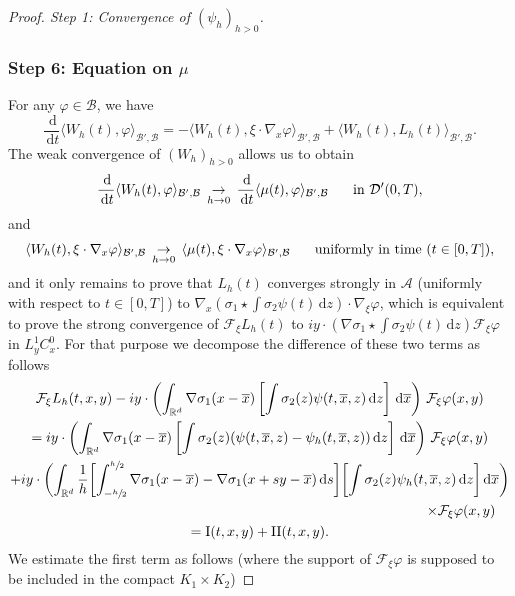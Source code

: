 \documentclass[JEP,XML,SOM,NoEqCountersInSection,NoFloatCountersInSection,Unicode,published]{cedram}
\let\bar\oldbar
\theoremstyle{definition}
\let\bar\overline
\newcommand{\R}{\mathbb{R}}
\newcommand{\ud}{\, {\mathrm{d}}}
\begin{document}
\begin{proof}[Proof. Step 1: Convergence of $(\psi_{h})_{h>0}$]
\subsubsection*{Step 6: Equation on $\mu$} For any $\varphi\in\mathcal{B}$, we have
\[
\frac{\ud}{\ud t}\langle W_{h}(t),\varphi\rangle_{\mathcal{B}',\mathcal{B}}=-\langle W_{h}(t),\xi\cdot\nabla_{x}\varphi\rangle_{\mathcal{B}',\mathcal{B}}+\langle W_{h}(t),L_{h}(t)\rangle_{\mathcal{B}',\mathcal{B}}.
\]
The weak convergence of $(W_{h})_{h>0}$ allows us to obtain
\[
\frac{\ud}{\ud t}\langle W_{h}(t),\varphi\rangle_{\mathcal{B}',\mathcal{B}}\,\underset{h\to 0}{\to}\,\frac{\ud}{\ud t}\langle \mu(t),\varphi\rangle_{\mathcal{B}',\mathcal{B}} \hspace{0.5cm}\text{ in }\mathcal{D}'(0,T),
\]
and
\[
\langle W_{h}(t),\xi\cdot\nabla_{x}\varphi\rangle_{\mathcal{B}',\mathcal{B}}\,\underset{h\to 0}{\to}\,\langle \mu(t),\xi\cdot\nabla_{x}\varphi\rangle_{\mathcal{B}',\mathcal{B}} \hspace{0.5cm}\text{ uniformly in time }(t\in[0,T]),
\]
and it only remains to prove that $L_{h}(t)$ converges strongly in $\mathcal{A}$ (uniformly with respect to $t\in[0,T]$) to $\nabla_{x}\left(\sigma_{1}\star\int\sigma_{2}\psi(t)\ud z\right)\cdot\nabla_{\xi}\varphi$, which is equivalent to prove the strong convergence of $\mathcal{F}_{\xi}L_{h}(t)$ to $iy\cdot(\nabla\sigma_{1}\star\int\sigma_{2}\psi(t)\ud z)\mathcal{F}_{\xi}\varphi$ in $L_{y}^{1}C_{x}^{0}$. For that purpose we decompose the difference of these two terms as follows
\bgroup
{}
\begin{multline*}
\mathcal{F}_{\xi}L_{h}(t,x,y)-iy\cdot\left(\int_{\R^{d}}\nabla\sigma_{1}(x-\bar{x})\left[\int\sigma_{2}(z)\psi(t,\bar{x},z)\ud z\right]\ud\bar{x}\right)\,\mathcal{F}_{\xi}\varphi(x,y)\\
=iy\cdot\left(\int_{\R^{d}}\nabla\sigma_{1}(x-\bar{x})\left[\int\sigma_{2}(z)(\psi(t,\bar{x},z)-\psi_{h}(t,\bar{x},z))\ud z\right]\ud\bar{x}\right)\,\mathcal{F}_{\xi}\varphi(x,y)\\
+iy\cdot\biggl(\int_{\R^{d}}\frac{1}{h}\biggl[\int_{-\sfrac{h}{2}}^{\sfrac{h}{2}}\nabla\sigma_{1}(x-\bar{x})-\nabla\sigma_{1}(x+sy-\bar{x})\ud s\biggr]\biggl[\int\sigma_{2}(z)\psi_{h}(t,\bar{x},z)\ud z\biggr]\ud\bar{x}\biggr)\\
\shoveright{\times \mathcal{F}_{\xi}\varphi(x,y)}\\
=\mathrm{I}(t,x,y)+\mathrm{II}(t,x,y).
\end{multline*}
\egroup
We estimate the first term as follows (where the support of $\mathcal{F}_{\xi}\varphi$ is supposed to be included in the compact $K_{1}\times K_{2}$)

\end{proof}
\end{document}
